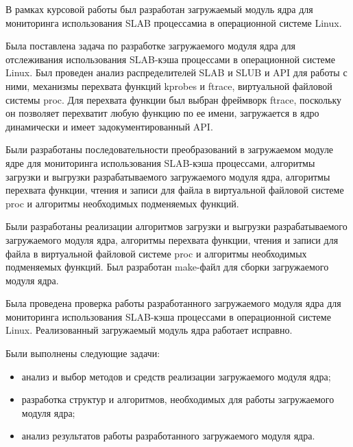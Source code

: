 
В рамках курсовой работы был разработан загружаемый модуль ядра для мониторинга использования SLAB процессамиа в операционной системе Linux.

Была поставлена задача по разработке загружаемого модуля ядра для отслеживания использования SLAB-кэша процессами в операционной системе Linux.
Был проведен анализ распределителей SLAB и SLUB и API для работы с ними, механизмы перехвата функций kprobes и ftrace, виртуальной файловой системы proc. Для перехвата функции был выбран фреймворк ftrace, поскольку он позволяет перехватит любую функцию по ее имени, загружается в ядро динамически и имеет задокументированный API.

Были разработаны последовательности преобразований в загружаемом модуле ядре для мониторинга использования SLAB-кэша процессами, алгоритмы загрузки и выгрузки разрабатываемого загружаемого модуля ядра, алгоритмы перехвата функции, чтения и записи для файла в виртуальной файловой системе proc и алгоритмы необходимых подменяемых функций.

Были разработаны реализации алгоритмов загрузки и выгрузки разрабатываемого загружаемого модуля ядра, алгоритмы перехвата функции, чтения и записи для файла в виртуальной файловой системе proc и алгоритмы необходимых подменяемых функций.
Был разработан make-файл для сборки загружаемого модуля ядра.

Была проведена проверка работы разработанного загружаемого модуля ядра для мониторинга использования SLAB-кэша процессами в операционной системе Linux.
Реализованный загружаемый модуль ядра работает исправно.

Были выполнены следующие задачи:
\begin{itemize}
	\item анализ и выбор методов и средств реализации загружаемого модуля ядра;
	\item разработка структур и алгоритмов, необходимых для работы загружаемого модуля ядра;
	\item анализ результатов работы разработанного загружаемого модуля ядра.
\end{itemize}
